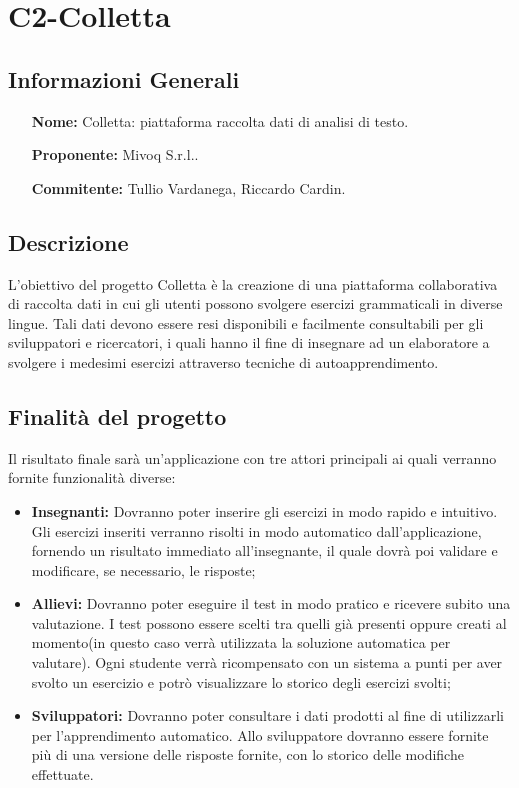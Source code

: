 \section{C2-Colletta} 
\subsection{Informazioni Generali}
\begin{itemize}
	\item[\bf Nome:] Colletta: piattaforma raccolta dati di analisi di testo.
	\item[\bf Proponente:]Mivoq S.r.l..
	\item[\bf Commitente:]Tullio Vardanega, Riccardo Cardin.
\end{itemize}
\subsection{Descrizione}
L'obiettivo del progetto Colletta è la creazione di una piattaforma collaborativa  di raccolta dati in cui gli utenti possono svolgere esercizi grammaticali in diverse lingue. Tali dati devono essere resi disponibili e facilmente consultabili per gli sviluppatori e ricercatori, i quali hanno il fine di insegnare ad un elaboratore a svolgere i medesimi esercizi attraverso tecniche di autoapprendimento.
\subsection{Finalità del progetto}
Il risultato finale sarà un'applicazione con tre attori principali ai quali verranno fornite funzionalità diverse:
\begin{itemize}
	\item \textbf{Insegnanti: }Dovranno poter inserire gli esercizi in modo rapido e intuitivo. Gli esercizi inseriti verranno risolti in modo automatico dall'applicazione, fornendo un risultato immediato all'insegnante, il quale dovrà poi validare e modificare, se necessario, le risposte;
	\item \textbf{Allievi: }Dovranno poter eseguire il test in modo pratico e ricevere subito una valutazione. I test possono essere scelti tra quelli già presenti oppure creati al momento(in questo caso verrà utilizzata la soluzione automatica per valutare). Ogni studente verrà ricompensato con un sistema a punti per aver svolto un esercizio e potrò visualizzare lo storico degli esercizi svolti;
	\item \textbf{Sviluppatori: }Dovranno poter consultare i dati prodotti al fine di utilizzarli per l'apprendimento automatico. Allo sviluppatore dovranno essere fornite più di una versione delle risposte fornite, con lo storico delle modifiche effettuate.
\end{itemize}
